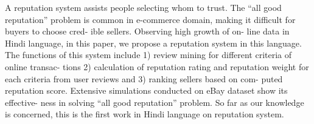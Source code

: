 A reputation system assists people selecting whom to trust. The ``all good reputation'' problem is common in e-commerce domain, making it difficult for buyers to choose cred- ible sellers. Observing high growth of on- line data in Hindi language, in this paper, we propose a reputation system in this language. The functions of this system include 1) review mining for different criteria of online transac- tions 2) calculation of reputation rating and reputation weight for each criteria from user reviews and 3) ranking sellers based on com- puted reputation score. Extensive simulations conducted on eBay dataset show its effective- ness in solving ``all good reputation'' problem. So far as our knowledge is concerned, this is the first work in Hindi language on reputation system.
